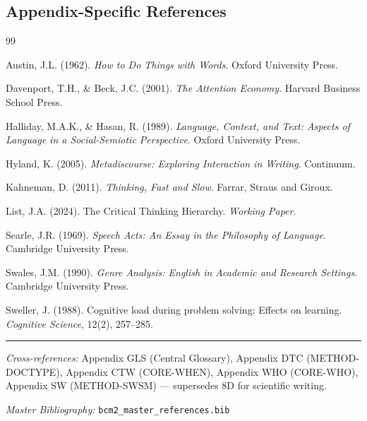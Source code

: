 \subsection{Appendix-Specific References}

\begin{thebibliography}{99}

 Austin, J.L. (1962).
\textit{How to Do Things with Words}.
Oxford University Press.

 Davenport, T.H., \& Beck, J.C. (2001).
\textit{The Attention Economy}.
Harvard Business School Press.

 Halliday, M.A.K., \& Hasan, R. (1989).
\textit{Language, Context, and Text: Aspects of Language in a Social-Semiotic Perspective}.
Oxford University Press.

 Hyland, K. (2005).
\textit{Metadiscourse: Exploring Interaction in Writing}.
Continuum.

 Kahneman, D. (2011).
\textit{Thinking, Fast and Slow}.
Farrar, Straus and Giroux.

 List, J.A. (2024).
The Critical Thinking Hierarchy.
\textit{Working Paper}.

 Searle, J.R. (1969).
\textit{Speech Acts: An Essay in the Philosophy of Language}.
Cambridge University Press.

 Swales, J.M. (1990).
\textit{Genre Analysis: English in Academic and Research Settings}.
Cambridge University Press.

 Sweller, J. (1988).
Cognitive load during problem solving: Effects on learning.
\textit{Cognitive Science}, 12(2), 257--285.

\end{thebibliography}



\vspace{1em}
\hrule
\vspace{0.5em}

\noindent\textit{Cross-references:}
Appendix GLS (Central Glossary),
Appendix DTC (METHOD-DOCTYPE),
Appendix CTW (CORE-WHEN),
Appendix WHO (CORE-WHO),
Appendix SW (METHOD-SWSM) --- supersedes 8D for scientific writing.

\noindent\textit{Master Bibliography:} \texttt{bcm2\_master\_references.bib}


